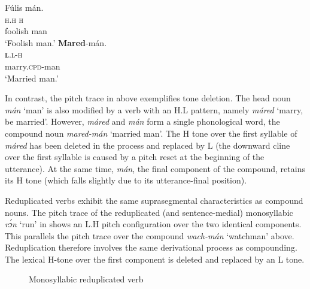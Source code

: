 \ea\label{ex:key:58}
\glll   Fúlis  mán.\\
\textsc{h.h}    \textsc{h}\\
foolish  man\\
\glt   ‘Foolish man.’ 
\z
\ea\label{ex:key:59}
\glll    \textbf{Mared}{}-mán.\\
\textbf{\textsc{l}}.\textsc{l-h}\\
marry.\textsc{cpd}{}-man\\
\glt ‘Married man.’
\z

In contrast, the pitch trace in  above exemplifies tone deletion. The head noun \textit{mán} ‘man’ is also modified by a verb with an H.L pattern, namely \textit{máred} ‘marry, be married’. However, \textit{máred} and \textit{mán} form a single phonological word, the compound noun \textit{mared-mán} ‘married man’. The H tone over the first syllable of \textit{máred} has been deleted in the process and replaced by L (the downward cline over the first syllable is caused by a pitch reset at the beginning of the utterance). At the same time, \textit{mán}, the final component of the compound, retains its H tone (which falls slightly due to its utterance-final position).

Reduplicated verbs exhibit the same suprasegmental characteristics as compound nouns. The pitch trace of the reduplicated (and sentence-medial) monosyllabic \textit{rɔ́n} ‘run’ in  shows an L.H pitch configuration over the two identical components. This parallels the pitch trace over the compound \textit{wach-mán} ‘watchman’ above. Reduplication therefore involves the same derivational process as compounding. The lexical H-tone over the first component is deleted and replaced by an L tone.


\begin{figure}
\caption{Monosyllabic reduplicated verb}
\label{fig:key:3.21}
\end{figure}

